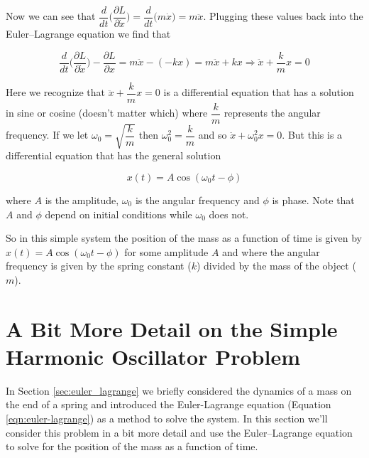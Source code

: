 \documentclass{article}
\theoremstyle{definition}
\begin{document}
\bigskip
\noindent
Now we can see that $\dfrac{d}{dt} \bigg ( \dfrac{\partial
L}{\partial \dot{x}} \bigg )   = \dfrac{d}{dt} \big ( m \dot{x}
\big ) = m \ddot{x}$. Plugging these values back into the
Euler–Lagrange equation we find that 

\bigskip
\begin{equation*}
\dfrac{d}{dt} \bigg ( \dfrac{\partial L}{\partial \dot{x}} \bigg ) - \dfrac{\partial L}{\partial x} = m \ddot{x} - (-kx) = m \ddot{x} + kx \Rightarrow \ddot{x} + \dfrac{k}{m} x = 0
\end{equation*}

\bigskip
{
\noindent
Here we recognize that $\ddot{x} + \dfrac{k}{m} x = 0$ is a
differential equation that has a solution in sine or cosine
(doesn't matter which) where $\dfrac{k}{m}$ represents the
angular frequency. If we let $\omega_0 = \sqrt{\dfrac{k}{m}}$
then $\omega_0^2 = \dfrac{k}{m}$ and so $\ddot{x} + \omega_0^2 x
= 0$. But this is a differential equation that has the general
solution \cite{harmonic_oscillartors} \par} 

 \bigskip
 \begin{equation*}
 x(t) = A \cos (\omega_0 t - \phi)
 \end{equation*}
 
 
 \bigskip
 \noindent
where $A$ is the amplitude, $\omega_0$ is the angular frequency
and $\phi$ is phase. Note that $A$ and $\phi$ depend on initial
conditions while  $\omega_0$ does not. 
 
 \bigskip
 \noindent
So in this simple system the position of the mass as a function
of time is given by $ x(t) = A \cos (\omega_0 t - \phi)$ for some
amplitude $A$ and where the angular frequency is given by the
spring constant ($k$) divided by the mass of the object ($m$). 


\section{A Bit More Detail on the Simple Harmonic Oscillator Problem}
\label{sec:simple_harmonic_oscillator}
In Section \ref{sec:euler_lagrange} we briefly considered the
dynamics of a mass on the end of a spring and introduced the
Euler-Lagrange equation (Equation \ref{eqn:euler-lagrange}) as a
method to solve the system. In this section we'll consider this
problem in a bit more detail and use the Euler–Lagrange equation
to solve for the position of the mass as a function of time. 
\end{document}
